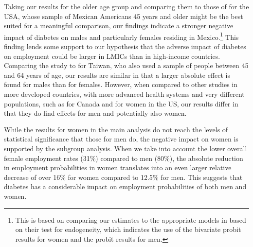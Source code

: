 Taking our results for the older age group and comparing
them to those of \textcite{Brown2005} for the USA, whose sample
of Mexican Americans 45 years and older might be the best suited for
a meaningful comparison, our findings indicate a stronger negative
impact of diabetes on males and particularly females residing in Mexico.\footnote{This is based on comparing our estimates to the appropriate
models in \textcite{Brown2005} based on their test for endogeneity,
which indicates the use of the bivariate probit results for women
and the probit results for men. } This finding lends some support to our hypothesis that the adverse
impact of diabetes on employment could be larger in \acp{LMIC} than
in high-income countries. Comparing the study to \textcite{Lin2011b}
for Taiwan, who also used a sample of people between 45 and 64 years
of age, our results are similar in that a larger absolute effect is found for
males than for females. However, when compared
to other studies in more developed countries, with more advanced health
systems and very different populations, such as \textcite{Latif2009}
for Canada and \textcite{Minor2011} for women in the US, our results
differ in that they do find effects for men and potentially also women. 

While the results for women in the main analysis do not reach the levels of statistical significance that those for men do, the negative impact on women is supported by the subgroup analysis. When we take into account the lower overall female employment rates (31\%) compared to men (80\%), the absolute reduction in employment probabilities in women translates into \DIFdelbegin {}\DIFdelend an even larger relative decrease of over 16\% for women compared to 12.5\% for men. This suggests that diabetes has a considerable impact on employment probabilities of both men and women.

